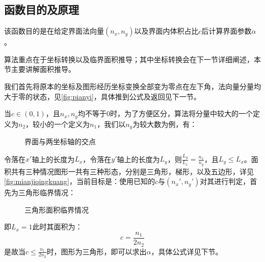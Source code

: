 \documentclass[lang=cn,11pt,a4paper]{elegantpaper}
\begin{document}
\subsection{函数目的及原理}
该函数目的是在给定界面法向量$(n_x,n_y)$以及界面内体积占比$c$后计算界面参数$\alpha$。\par
算法重点在于坐标转换以及临界面积推导；其中坐标转换会在下一节详细阐述，本节主要讲解面积推导。\par
我们首先将原本的坐标及图形经历坐标变换全部变为零点在左下角，法向量分量均大于零的状态，见\ref{fig:pianyi}，具体推到公式及返回见下一节。\par
当$c\in (0,1)$，且$n_x,n_y$均不等于0时，为了方便区分，算法将分量中较大的一个定义为$n_2$，较小的一个定义为$n_1$，我们以$n_y$为较大数为例，有：\par
\begin{figure}[htbp]
    \centering
    \caption{界面与两坐标轴的交点}
    \label{fig:jiaodian}
\end{figure}
令落在$x'$轴上的长度为$L_x$，令落在$y'$轴上的长度为$L_y$，则$\frac{L_y}{L_x}=\frac{n_x}{n_y}$，且$L_y\leq L_x$。面积共有三种情况图形一共有三种形态，分别是三角形，梯形，以及五边形，详见\ref{fig:mianjiqingkuang}，当前目标是：使用已知的$c$与$(n_x',n_y')$对其进行判定，首先为三角形临界情况：\par
\begin{figure}[htbp]
    \centering
    \caption{三角形面积临界情况}
    \label{fig:sanjiaomingjilinjie}
\end{figure}
即$L_x=1$此时其面积为：
\begin{equation}
    c = \frac{n_1}{2n_2}
\end{equation}
是故当$c\leq \frac{n_1}{2n_2}$时，图形为三角形，即可以求出$\alpha$，具体公式详见下节。\par
\end{document}
